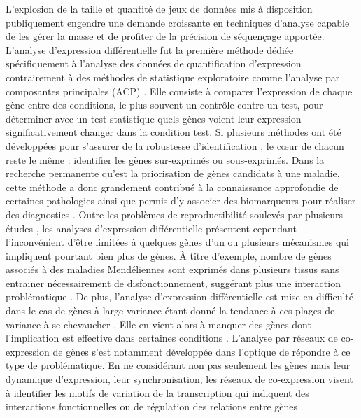 L'explosion de la taille et quantité de jeux de données mis à disposition publiquement engendre une demande croissante en techniques d'analyse capable de les gérer la masse et de profiter de la précision de séquençage apportée. 
L'analyse d'expression différentielle fut la première méthode dédiée spécifiquement à l'analyse des données de quantification d'expression contrairement à des méthodes de statistique exploratoire comme l'analyse par composantes principales (ACP) \cite{deKok2005Jan}. Elle consiste à comparer l'expression de chaque gène entre des conditions, le plus souvent un contrôle contre un test, pour déterminer avec un test statistique quels gènes voient leur expression significativement changer dans la condition test. Si plusieurs méthodes ont été développées pour s'assurer de la robustesse d'identification \cite{Soneson2013Dec,Spies2019Jan}, le cœur de chacun reste le même : identifier les gènes sur-exprimés ou sous-exprimés. Dans la recherche permanente qu'est la priorisation de gènes candidats à une maladie, cette méthode a donc grandement contribué à la connaissance approfondie de certaines pathologies ainsi que permis d'y associer des biomarqueurs pour réaliser des diagnostics \cite{Costa-Silva2017Dec}. Outre les problèmes de reproductibilité soulevés par plusieurs études \cite{Ostlund2014}, les analyses d'expression différentielle présentent cependant l'inconvénient d'être limitées à quelques gènes d'un ou plusieurs mécanismes qui impliquent pourtant bien plus de gènes. À titre d'exemple, nombre de gènes associés à des maladies Mendéliennes sont exprimés dans plusieurs tissus sans entrainer nécessairement de disfonctionnement, suggérant  plus une interaction problématique \cite{Hekselman2020Mar}. De plus, l'analyse d'expression différentielle est mise en difficulté dans le cas de gènes à large variance étant donné la tendance à ces plages de variance à se chevaucher \cite{Ostlund2014}. Elle en vient alors à manquer des gènes dont l'implication est effective dans certaines conditions \cite{delaFuente2010Jul}. L'analyse par réseaux de co-expression de gènes s'est notamment développée dans l'optique de répondre à ce type de problématique. En ne considérant non pas seulement les gènes mais leur dynamique d'expression, leur synchronisation, les réseaux de co-expression visent à identifier les motifs de variation de la transcription qui indiquent des interactions fonctionnelles ou de régulation des relations entre gènes \cite{Parsana2019}.

